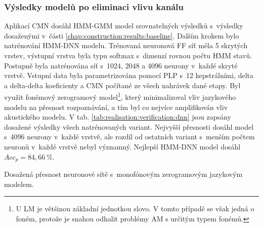 \subsubsection{Výsledky modelů po eliminaci vlivu kanálu}

Aplikací CMN dosáhl HMM-GMM model srovnatelných výsledků s~výsledky dosaženými v~části \ref{chap:construction:results:baseline}.
Dalším krokem bylo natrénování HMM-DNN modelu.
Trénovaná neuronová FF síť měla 5 skrytých vrstev, výstupní vrstva byla typu softmax s~dimenzí rovnou počtu HMM stavů.
Postupně byla natrénována síť s~1024, 2048 a 4096 neurony v~každé skryté vrstvě.
Vstupní data byla parametrizována pomocí PLP s~12 kepstrálními, delta a delta-delta koeficienty a CMN počítané ze všech nahrávek dané etapy.
Byl využit fonémový zerogramový model\footnote{U LM je většinou základní jednotkou slovo. V tomto případě se však jedná o foném, protože je snahou odhalit problémy AM s určitým typem fonémů.}, který minimalizoval vliv jazykového modelu na přesnost rozpoznávání, a tím byl co nejvíce amplifikován vliv akustického modelu.
V tab. \ref{tab:realisation:verification:dnn} jsou zapsány dosažené výsledky všech natrénovaných variant.
Nejvyšší přesnosti dosáhl model s~4096 neurony v~každé vrstvě, ale rozdíl od ostatních variant s~menším počtem neuronů v~každé vrstvě nebyl významný.
Nejlepší HMM-DNN model dosáhl $Acc_{p} = 84,66~\%$.

\begin{table}[htpb]
  \centering
  \def\arraystretch{1.5}
  \caption[Přesnost neuronové sítě s~monofónovým zerogramovým LM.]{Dosažená přesnost neuronové sítě s~monofónovým zerogramovým jazykovým modelem.}
  \label{tab:realisation:verification:dnn}
\end{table}
